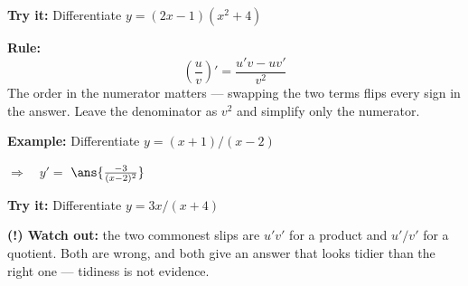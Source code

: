 \documentclass[12pt]{article}
\begin{document}
\begin{tryitbox}
\textbf{Try it:} \quad Differentiate $y = (2x-1)\left(x^2+4\right)$\\[2pt]
\end{tryitbox}


\begin{formulabox}
\textbf{Rule:}
\[
  \left(\frac{u}{v}\right)' = \frac{u'v - uv'}{v^2}
\]
The order in the numerator matters --- swapping the two terms flips every sign
in the answer. Leave the denominator as $v^2$ and simplify only the numerator.
\end{formulabox}

\begin{examplebox}
\textbf{Example:} \quad Differentiate $y = (x+1)/(x-2)$

$\Rightarrow\quad y' = $ $\ans{\tfrac{-3}{(x-2)^2}}$
\end{examplebox}

\begin{tryitbox}
\textbf{Try it:} \quad Differentiate $y = 3x/(x+4)$\\[2pt]
\end{tryitbox}

\begin{watchoutbox}
\textbf{(!) Watch out:} the two commonest slips are $u'v'$ for a product and
$u'/v'$ for a quotient. Both are wrong, and both give an answer that looks
tidier than the right one --- tidiness is not evidence.
\end{watchoutbox}
\end{document}
